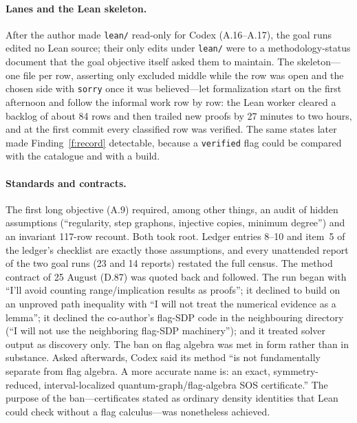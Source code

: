 \documentclass[11pt,a4paper]{article}
\newcommand{\ttt}[1]{\texttt{#1}}
\begin{document}
\paragraph{Lanes and the Lean skeleton.} After the author made \ttt{lean/} read-only for Codex (A.16--A.17), the goal
runs edited no Lean source; their only edits under \ttt{lean/} were to a methodology-status document that the
goal objective itself asked them to maintain. The skeleton---one file per row, asserting only excluded middle
while the row was open and the chosen side with \ttt{sorry} once it was believed---let formalization start on the
first afternoon and follow the informal work row by row: the Lean worker cleared a backlog of about 84 rows and
then trailed new proofs by 27 minutes to two hours, and at the first commit every classified row was verified.
The same states later made Finding~\ref{f:record} detectable, because a \ttt{verified} flag could be compared
with the catalogue and with a build.

\paragraph{Standards and contracts.} The first long objective (A.9) required, among other things, an audit of
hidden assumptions (``regularity, step graphons, injective copies, minimum degree'') and an invariant 117-row
recount. Both took root. Ledger entries 8--10 and item~5 of the ledger's checklist are exactly those
assumptions, and every unattended report of the two goal runs (23 and 14 reports) restated the full census. The
method contract of 25 August (D.87) was quoted back and followed. The run began with ``I'll avoid counting
range/implication results as proofs''; it declined to build on an unproved path inequality with ``I will not
treat the numerical evidence as a lemma''; it declined the co-author's flag-SDP code in the neighbouring
directory (``I will not use the neighboring flag-SDP machinery''); and it treated solver output as discovery only.
The ban on flag algebra was met in form rather than in substance. Asked afterwards, Codex said its method ``is
not fundamentally separate from flag algebra. A more accurate name is: an exact, symmetry-reduced,
interval-localized quantum-graph/flag-algebra SOS certificate.'' The purpose of the ban---certificates stated as
ordinary density identities that Lean could check without a flag calculus---was nonetheless achieved.
\end{document}
